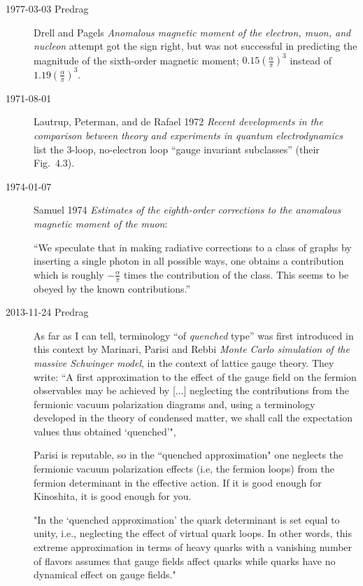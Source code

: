 \begin{description}


\item[1977-03-03 Predrag]
Drell and Pagels
{\em Anomalous magnetic moment of the electron, muon, and nucleon}
attempt got the sign right, but was not successful in predicting the
magnitude of the sixth-order magnetic moment;
$0.15 \left(\frac{\alpha}{\pi}\right)^3$ instead of
$1.19 \left(\frac{\alpha}{\pi}\right)^3$.

\item[1971-08-01]
Lautrup, Peterman, and de Rafael 1972 {\em Recent
developments in the comparison between theory and experiments in quantum
electrodynamics} list the 3-loop, no-electron loop ``gauge invariant
subclasses'' (their Fig.~4.3).

\item[1974-01-07]
Samuel 1974 {\em Estimates of the eighth-order corrections
to the anomalous magnetic moment of the muon}:

``We speculate that in making radiative corrections to a class of graphs
by inserting a single photon in all possible ways, one obtains a
contribution which is roughly $-\frac{\alpha}{\pi}$ times the
contribution of the class. This seems to be obeyed by the known
contributions.''

\item[2013-11-24  Predrag]
As far as I can tell, terminology ``of \emph{quenched} type'' was first
introduced in this context by
Marinari, Parisi and Rebbi
{\em {Monte Carlo} simulation of the massive {Schwinger} model},
in the context of lattice gauge theory. They write:
``A first approximation to the effect of the gauge field on the fermion
observables may be achieved by [...] neglecting the contributions from
the fermionic vacuum polarization diagrams and, using a terminology
developed in the theory of condensed matter, we shall call the
expectation values thus obtained `quenched'",

Parisi is reputable, so in the ``quenched approximation" one neglects
the fermionic vacuum polarization effects (i.e, the fermion loops) from
the fermion determinant in the effective action. If it is good enough for Kinoshita,
it is good enough for you.

"In the ‘quenched approximation’ the quark determinant is set equal to
unity, i.e., neglecting the effect of virtual quark loops. In
other words, this extreme approximation in terms of heavy quarks with a
vanishing number of flavors assumes that gauge fields affect quarks while
quarks have no dynamical effect on gauge fields."


\end{description}
